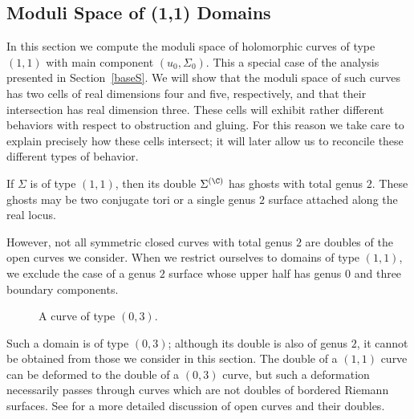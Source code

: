 \subsection{Moduli Space of (1,1) Domains} \label{base11ss}

In this section we compute the moduli space of holomorphic curves of type $(1,1)$ with main component $(u_0,\Sigma_0)$. This a special case of the analysis presented in Section~\ref{baseS}. We will show that the moduli space of such curves has two cells of real dimensions four and five, respectively, and that their intersection has real dimension three. These cells will exhibit rather different behaviors with respect to obstruction and gluing. For this reason we take care to explain precisely how these cells intersect; it will later allow us to reconcile these different types of behavior.

\begin{remark}
If $\Sigma$ is of type $(1,1)$, then its double $\Sigma^{(\C)}$ has ghosts with total genus $2$. These ghosts may be two conjugate tori or a single genus $2$ surface attached along the real locus.

However, not all symmetric closed curves with total genus $2$ are doubles of the open curves we consider. 
When we restrict ourselves to domains of type $(1,1)$, we exclude the case of a genus $2$ surface whose upper half has genus $0$ and three boundary components.
\begin{figure}[ht]
\centering
{}
\caption{A curve of type $(0,3)$.}
\end{figure}
Such a domain is of type $(0,3)$; although its double is also of genus $2$, it cannot be obtained from those we consider in this section. The double of a $(1,1)$ curve can be deformed to the double of a $(0,3)$ curve, but such a deformation necessarily passes through curves which are not doubles of bordered Riemann surfaces. See \cite{katzLiu} for a more detailed discussion of open curves and their doubles.
\end{remark}

